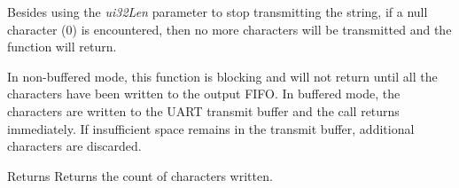 Besides using the {\itshape ui32\+Len} parameter to stop transmitting the string, if a null character (0) is encountered, then no more characters will be transmitted and the function will return.

In non-\/buffered mode, this function is blocking and will not return until all the characters have been written to the output F\+I\+F\+O. In buffered mode, the characters are written to the U\+A\+R\+T transmit buffer and the call returns immediately. If insufficient space remains in the transmit buffer, additional characters are discarded.

\begin{DoxyReturn}{Returns}
Returns the count of characters written. 
\end{DoxyReturn}
